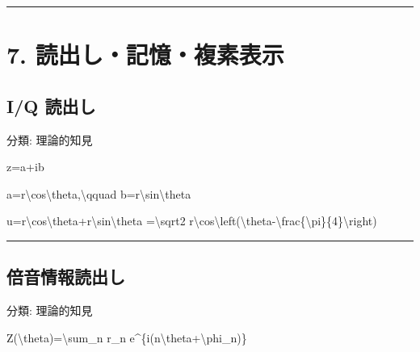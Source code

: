 \documentclass[
  a4paper,
]{ltjsarticle}
\newenvironment{Shaded}{}{}
\newcommand{\NormalTok}[1]{#1}
\begin{document}
\begin{center}\rule{0.5\linewidth}{0.5pt}\end{center}

\section{7.
読出し・記憶・複素表示}\label{ux8aadux51faux3057ux8a18ux61b6ux8907ux7d20ux8868ux793a}

\subsection{I/Q 読出し}\label{iq-ux8aadux51faux3057}

分類: 理論的知見

\begin{Shaded}
\begin{Highlighting}[]
\NormalTok{z=a+ib}
\end{Highlighting}
\end{Shaded}

\begin{Shaded}
\begin{Highlighting}[]
\NormalTok{a=r\textbackslash{}cos\textbackslash{}theta,\textbackslash{}qquad b=r\textbackslash{}sin\textbackslash{}theta}
\end{Highlighting}
\end{Shaded}

\begin{Shaded}
\begin{Highlighting}[]
\NormalTok{u=r\textbackslash{}cos\textbackslash{}theta+r\textbackslash{}sin\textbackslash{}theta}
\NormalTok{=\textbackslash{}sqrt2 r\textbackslash{}cos\textbackslash{}left(\textbackslash{}theta{-}\textbackslash{}frac\{\textbackslash{}pi\}\{4\}\textbackslash{}right)}
\end{Highlighting}
\end{Shaded}

\begin{center}\rule{0.5\linewidth}{0.5pt}\end{center}

\subsection{倍音情報読出し}\label{ux500dux97f3ux60c5ux5831ux8aadux51faux3057}

分類: 理論的知見

\begin{Shaded}
\begin{Highlighting}[]
\NormalTok{Z(\textbackslash{}theta)=\textbackslash{}sum\_n r\_n e\^{}\{i(n\textbackslash{}theta+\textbackslash{}phi\_n)\}}
\end{Highlighting}
\end{Shaded}
\end{document}
